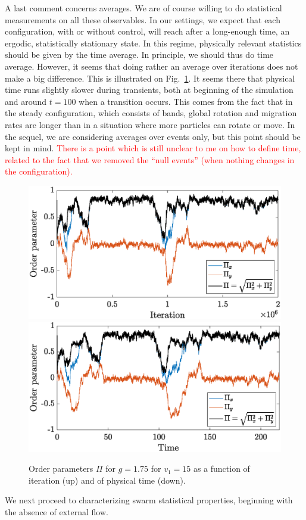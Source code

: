 \documentclass[aps,prl,twocolumn,amsmath,amssymb,superscriptaddress]{revtex4-1}
\newcommand{\obs}[1]{\textcolor{red}{#1}}
\begin{document}
A last comment concerns averages. We are of course willing to do statistical measurements on all these observables. In our settings, we expect that each configuration, with or without control, will reach after a long-enough time, an ergodic, statistically  stationary state. In this regime, physically relevant statistics should be given by the time average. In principle, we should thus do time average. However, it seems that doing rather an average over iterations does not make a big difference. This is illustrated on Fig.~\ref{fig:compare_times}. It seems there that physical time runs slightly slower during transients, both at beginning of the simulation and around $t=100$ when a transition occurs. This comes from the fact that in the steady configuration, which consists of bands, global rotation and migration rates are longer than in a situation where more particles can rotate or move. In the sequel, we are considering averages over events only, but this point should be kept in mind. \obs{There is a point which is still unclear to me on how to define time, related to the fact that we removed the ``null events'' (when nothing changes in the configuration).}
\begin{figure}[h!]
   \centering
   \includegraphics[width=.38\textwidth]{ord_param_phi_g1.75_v1_15_fn_iter}\\
   \includegraphics[width=.38\textwidth]{ord_param_phi_g1.75_v1_15_fn_time}
   \vspace{-10pt}
   \caption{\label{fig:compare_times} Order parameters $\Pi$ for $g=1.75$ for $v_1=15$ as a function of iteration (up) and of physical time (down).}
\end{figure}

We next proceed to characterizing swarm statistical properties, beginning with the absence of external flow.
\end{document}
